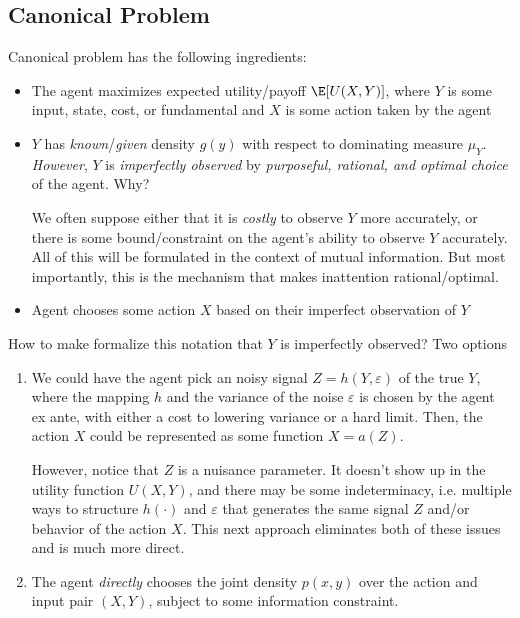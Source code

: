 \documentclass[12pt]{article}
\theoremstyle{plain}
\theoremstyle{definition}
\theoremstyle{remark}
\begin{document}
\clearpage
\subsection{Canonical Problem}

Canonical problem has the following ingredients:
\begin{itemize}
  \item The agent maximizes expected utility/payoff $\E[U(X,Y)]$, where
    $Y$ is some input, state, cost, or fundamental and $X$ is some
    action taken by the agent
  \item
    $Y$ has \emph{known}/\emph{given} density $g(y)$ with respect to
    dominating measure $\mu_Y$.
    \emph{However}, $Y$ is \emph{imperfectly observed} by
    \emph{purposeful, rational, and optimal choice} of the agent.
    Why?

    We often suppose either that it is \emph{costly} to observe $Y$
    more accurately, or there is some bound/constraint on
    the agent's ability to observe $Y$ accurately.
    All of this will be formulated in the context of mutual information.
    But most importantly, this is the mechanism that makes inattention
    rational/optimal.
  \item
    Agent chooses some action $X$ based on their imperfect observation
    of $Y$
\end{itemize}
How to make formalize this notation that $Y$ is imperfectly observed?
Two options
\begin{enumerate}[label=(\roman*)]
  \item
    We could have the agent pick an noisy signal $Z=h(Y,\varepsilon)$ of
    the true $Y$, where the mapping $h$ and the variance of the noise
    $\varepsilon$ is chosen by the agent ex ante, with either a cost to
    lowering variance or a hard limit.
    Then, the action $X$ could be represented as some function $X=a(Z)$.

    However, notice that $Z$ is a nuisance parameter.
    It doesn't show up in the utility function $U(X,Y)$, and there may
    be some indeterminacy, i.e. multiple ways to structure $h(\cdot)$
    and $\varepsilon$ that generates the same signal $Z$ and/or behavior
    of the action $X$.
    This next approach eliminates both of these issues and is much more
    direct.
  \item
    The agent \emph{directly} chooses the joint density $p(x,y)$ over
    the action and input pair $(X,Y)$, subject to some information
    constraint.
\end{enumerate}
\end{document}
